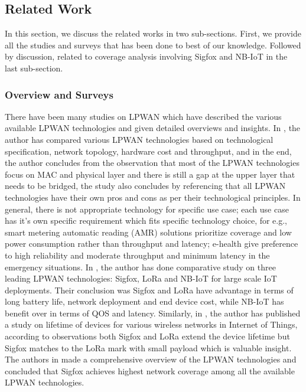 \documentclass[12pt]{article}
\begin{document}
\subsection{Related Work}\label{related work}
In this section, we discuss the related works in two sub-sections. First, we provide all the studies and surveys that has been done to best of our knowledge. Followed by discussion, related to coverage analysis involving Sigfox and NB-IoT in the last sub-section.
\subsubsection{Overview and Surveys}
There have been many studies on LPWAN which have described the various available LPWAN technologies and given detailed overviews and insights. In \cite{raza2017low}, the author has compared various LPWAN technologies based on technological specification, network topology, hardware cost and throughput, and in the end, the author concludes from the observation that most of the LPWAN technologies focus on MAC and physical layer and there is still a gap at the upper layer that needs to be bridged, the study also concludes by referencing that all LPWAN technologies have their own pros and cons as per their technological principles. In general, there is not appropriate technology for specific use case; each use case has it's own specific requirement which fits specific technology choice, for e.g., smart metering automatic reading (AMR) solutions prioritize coverage and low power consumption rather than throughput and latency; e-health give preference to high reliability and moderate throughput and minimum latency in the emergency situations. In \cite{mekki2019comparative}, the author has done comparative study on three leading LPWAN technologies: Sigfox, LoRa and NB-IoT for large scale IoT deployments. Their conclusion was Sigfox and LoRa have advantage in terms of long battery life, network deployment and end device cost, while NB-IoT has benefit over in terms of QOS and latency. Similarly, in \cite{morin2017comparison}, the author has published a study on lifetime of devices for various wireless networks in Internet of Things, according to observations both Sigfox and LoRa extend the device lifetime but Sigfox matches to the LoRa mark with small payload which is valuable insight. The authors in \cite{mekki2018overview} made a comprehensive overview of the LPWAN technologies and concluded that Sigfox achieves highest network coverage among all the available LPWAN technologies.\par
\end{document}
